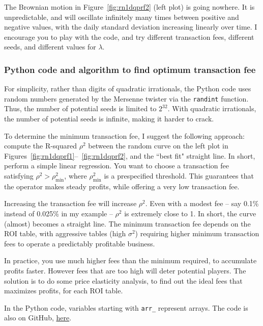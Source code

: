 \documentclass[oneside,10pt]{book}
\begin{document}
The Brownian motion in Figure~\ref{fig:rn1dqprf2} (left plot) is going nowhere. It is unpredictable, and will oscillate infinitely
 many times between positive and negative values, with the daily standard deviation increasing linearly over time. I encourage you
 to play with the code, and try different transaction fees, different seeds, and different values for $\lambda$.




\subsubsection{Python code and algorithm to find optimum transaction fee}

For simplicity, rather than digits of quadratic irrationals, the Python code uses random numbers generated by the \textcolor{index}{Mersenne twister} via the \texttt{randint} function. Thus, the number of potential seeds is limited to $2^{32}$. With quadratic irrationals, the number of potential seeds is infinite, making it harder to crack.

To determine the minimum transaction fee, I suggest the following approach: compute the
\textcolor{index}{R-squared} $\rho^2$  between the random curve
 on the left plot in Figures~\ref{fig:rn1dqprf1}--~\ref{fig:rn1dqprf2}, and the ``best fit" straight line. In short, perform a simple
 linear regression. You want to choose a transaction fee satisfying
$\rho^2>\rho^2_{\text{min}}$,
 where
$\rho^2_{\text{min}}$ is a prespecified threshold. This guarantees that the operator makes steady profits, while offering a very low transaction fee.

Increasing the transaction fee will increase $\rho^2$. Even with a modest fee -- say 0.1\% instead of 0.025\% in my example --
 $\rho^2$ is extremely close to 1. In short, the curve (almost) becomes a straight line. The minimum transaction fee
 depends on the ROI table, with aggressive tables (high $\sigma^2$) requiring higher minimum transaction fees to operate a
predictably profitable business.

In practice, you use much higher fees than the minimum required, to accumulate profits faster. However fees that are too high
 will deter potential players. The solution is to do some price elasticity analysis, to find out the ideal fees that maximizes profits,
 for each ROI table.


In the Python code, variables starting with \texttt{arr\_} represent arrays.  The code is also on GitHub, \href{https://github.com/VincentGranville/Stochastic-Processes/blob/master/lottery_profits.py}{here}. \vspace{1ex}
\end{document}
